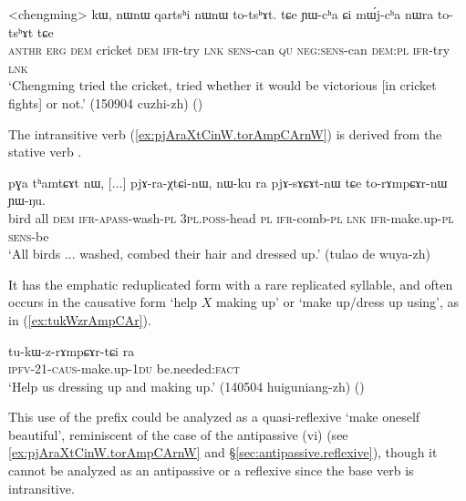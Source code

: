 \begin{exe}
\ex \label{ex:YWcha.Ci.mWjcha.totshAt}
\gll <chengming> kɯ, nɯnɯ qartsʰi nɯnɯ to-tsʰɤt. tɕe ɲɯ-cʰa ɕi mɯ́j-cʰa nɯra to-tsʰɤt tɕe  \\
\textsc{anthr} \textsc{erg} \textsc{dem} cricket \textsc{dem} \textsc{ifr}-try \textsc{lnk} \textsc{sens}-can \textsc{qu} \textsc{neg}:\textsc{sens}-can \textsc{dem}:\textsc{pl} \textsc{ifr}-try \textsc{lnk} \\
\glt `Chengming tried the cricket, tried whether it would be victorious [in cricket fights] or not.'  (150904 cuzhi-zh)
()
\end{exe}
 
The intransitive verb  (\ref{ex:pjAraXtCinW.torAmpCArnW}) is derived from the stative verb .

\begin{exe}
\ex \label{ex:pjAraXtCinW.torAmpCArnW}
\gll pɣa tʰamtɕɤt nɯ, [...] pjɤ-ra-χtɕi-nɯ, nɯ-ku ra pjɤ-sɤɕɤt-nɯ tɕe to-rɤmpɕɤr-nɯ ɲɯ-ŋu. \\
bird all \textsc{dem} {  } \textsc{ifr}-\textsc{apass}-wash-\textsc{pl} \textsc{3pl}.\textsc{poss}-head \textsc{pl} \textsc{ifr}-comb-\textsc{pl} \textsc{lnk} \textsc{ifr}-make.up-\textsc{pl} \textsc{sens}-be \\
\glt `All birds ... washed, combed their hair and dressed up.' (tulao de wuya-zh)
\end{exe}

It has the emphatic reduplicated form  with a rare  replicated syllable, and  often occurs in the causative form  `help $X$ making up' or `make up/dress up using', as in (\ref{ex:tukWzrAmpCAr}).

\begin{exe}
\ex \label{ex:tukWzrAmpCAr}
\gll tu-kɯ-z-rɤmpɕɤr-tɕi ra \\
\textsc{ipfv}-2\fl{}1-\textsc{caus}-make.up-\textsc{1du} be.needed:\textsc{fact} \\
\glt `Help us dressing up and making up.' (140504 huiguniang-zh) ()
\end{exe}
 
This use of the  prefix could be analyzed as a quasi-reflexive `make oneself beautiful', reminiscent of the case of the antipassive  (vi) (see \ref{ex:pjAraXtCinW.torAmpCArnW} and §\ref{sec:antipassive.reflexive}), though it cannot be analyzed as an antipassive or a reflexive since the base verb is intransitive.

